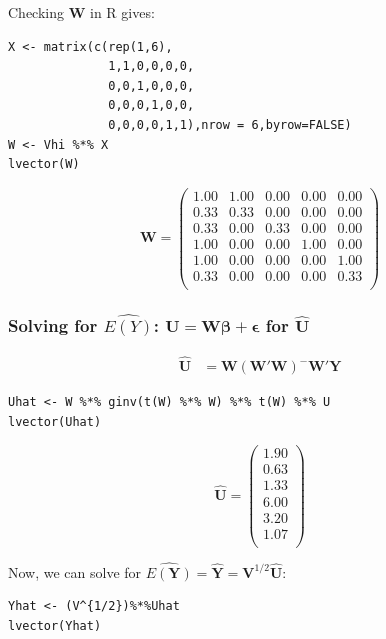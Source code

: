 \documentclass[11pt]{article}
\begin{document}
Checking \textbf{W} in R gives:

\begin{verbatim}
X <- matrix(c(rep(1,6),
              1,1,0,0,0,0,
              0,0,1,0,0,0,
              0,0,0,1,0,0,
              0,0,0,0,1,1),nrow = 6,byrow=FALSE)
W <- Vhi %*% X
lvector(W)
\end{verbatim}

\[
\mathbf{W} =
\begin{pmatrix}{}
  1.00 & 1.00 & 0.00 & 0.00 & 0.00 \\ 
  0.33 & 0.33 & 0.00 & 0.00 & 0.00 \\ 
  0.33 & 0.00 & 0.33 & 0.00 & 0.00 \\ 
  1.00 & 0.00 & 0.00 & 1.00 & 0.00 \\ 
  1.00 & 0.00 & 0.00 & 0.00 & 1.00 \\ 
  0.33 & 0.00 & 0.00 & 0.00 & 0.33 \\ 
  \end{pmatrix}
\]
\subsubsection{Solving for $\hat{E(Y)}$: $\mathbf{U} = \mathbf{W\beta} + \mathbf{\epsilon}$ for $\hat{\mathbf{U}}$}
\label{sec-2-1-1}


\begin{align*}
\hat{\mathbf{U}} &=
\mathbf{W}(\mathbf{W}'\mathbf{W})^{-}\mathbf{W}'\mathbf{Y}
\end{align*}

\begin{verbatim}
Uhat <- W %*% ginv(t(W) %*% W) %*% t(W) %*% U
lvector(Uhat)
\end{verbatim}

\[
\hat{\mathbf{U}} =
\begin{pmatrix}{}
  1.90 \\ 
  0.63 \\ 
  1.33 \\ 
  6.00 \\ 
  3.20 \\ 
  1.07 \\ 
  \end{pmatrix}
\]

Now, we can solve for $\hat{E(\mathbf{Y})} = \hat{\mathbf{Y}} =
\mathbf{V}^{1/2}\hat{\mathbf{U}}$:


\begin{verbatim}
Yhat <- (V^{1/2})%*%Uhat
lvector(Yhat)
\end{verbatim}
\end{document}
